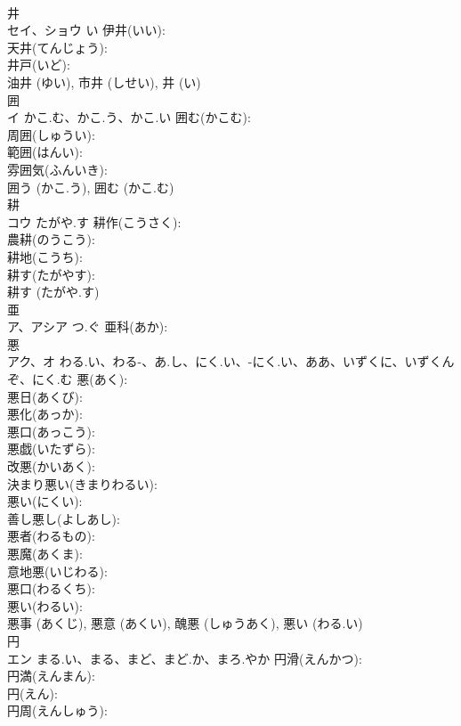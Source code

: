 \documentclass[8pt]{extreport}
\begin{document}
\begin{CJK}{UTF8}{min}
\\	井			
\\	セイ、ショウ	い	伊井(いい): 
\\	天井(てんじょう): 
\\	井戸(いど): 
\\	油井 (ゆい), 市井 (しせい), 井 (い)
\\	囲			
\\	イ	かこ.む、かこ.う、かこ.い	囲む(かこむ): 
\\	周囲(しゅうい): 
\\	範囲(はんい): 
\\	雰囲気(ふんいき): 
\\	囲う (かこ.う), 囲む (かこ.む)
\\	耕			
\\	コウ	たがや.す	耕作(こうさく): 
\\	農耕(のうこう): 
\\	耕地(こうち): 
\\	耕す(たがやす): 
\\	耕す (たがや.す)
\\	亜			
\\	ア、アシア	つ.ぐ	亜科(あか): 
\\	悪			
\\	アク、オ	わる.い、わる-、あ.し、にく.い、-にく.い、ああ、いずくに、いずくんぞ、にく.む	悪(あく): 
\\	悪日(あくび): 
\\	悪化(あっか): 
\\	悪口(あっこう): 
\\	悪戯(いたずら): 
\\	改悪(かいあく): 
\\	決まり悪い(きまりわるい): 
\\	悪い(にくい): 
\\	善し悪し(よしあし): 
\\	悪者(わるもの): 
\\	悪魔(あくま): 
\\	意地悪(いじわる): 
\\	悪口(わるくち): 
\\	悪い(わるい): 
\\	悪事 (あくじ), 悪意 (あくい), 醜悪 (しゅうあく), 悪い (わる.い)
\\	円			
\\	エン	まる.い、まる、まど、まど.か、まろ.やか	円滑(えんかつ): 
\\	円満(えんまん): 
\\	円(えん): 
\\	円周(えんしゅう): 

\end{CJK}
\end{document}
